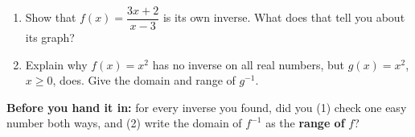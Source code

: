 \documentclass[11pt,letterpaper]{article}
\newif\ifkey
\newcommand{\finv}{f^{-1}}
\newcommand{\work}[2][]{\ifkey\begin{sol}#2\end{sol}\else\vspace*{#1}\fi}
\newcommand{\np}[1][6cm]{\needspace{#1}}
\begin{document}
\begin{enumerate}[resume,leftmargin=*,label=\textbf{\arabic*.},itemsep=6pt]
\np\item Show that $f(x)=\dfrac{3x+2}{x-3}$ is its own inverse. What does that tell you about its graph?
\work[3.4cm]{$f(f(x))=\dfrac{3\cdot\frac{3x+2}{x-3}+2}{\frac{3x+2}{x-3}-3}=\dfrac{\frac{9x+6+2x-6}{x-3}}{\frac{3x+2-3x+9}{x-3}}=\dfrac{11x}{11}=x$ \; for $x\neq3$. \\
So $\finv=f$. Its graph is symmetric about the line $y=x$ (reflecting it changes nothing). Also: domain $x\neq3$ and range $y\neq3$ are the same set, as they must be.}

\np\item Explain why $f(x)=x^2$ has no inverse on all real numbers, but $g(x)=x^2$, $x\ge0$, does. Give the domain and range of $g^{-1}$.
\work[2.6cm]{$f(-2)=f(2)=4$: two inputs give the same output, so ``undo'' would have to send $4$ to two places — not a function (horizontal line test fails). Restricting to $x\ge0$ keeps each output only once. \\
$g^{-1}(x)=\sqrt{x}$: domain $[0,\infty)$ (range of $g$), range $[0,\infty)$ (domain of $g$).}
\end{enumerate}

\ifkey\else
\vfill
\begin{simple}
\textbf{Before you hand it in:} for every inverse you found, did you (1) check one easy number both ways, and (2) write the domain of $\finv$ as the \textbf{range of} $f$?
\end{simple}
\fi
\end{document}
